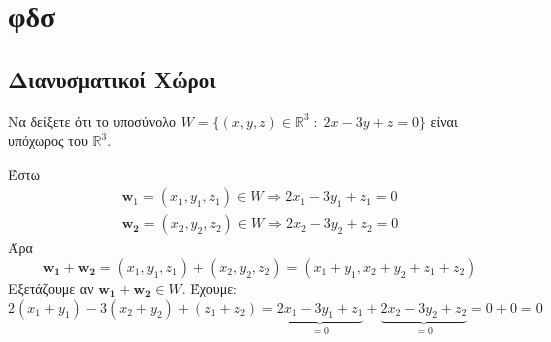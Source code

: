 





\chapter{φδσ}

\section{Διανυσματικοί Χώροι}


\begin{exercise}
    Να δείξετε ότι το υποσύνολο $ W = \{(x,y,z)\in \mathbb{R}^{3} \; : 
    \; 2x-3y+z=0 \} $ είναι υπόχωρος του $ \mathbb{R}^{3} $.
\end{exercise}

\begin{solution}
\item {}
    Έστω 
    \begin{align*}
        \mathbf{w}_{1} = (x_{1}, y_{1}, z_{1}) \in W 
        \Rightarrow  2 x_{1} - 3 y_{1} + z_{1} = 0 \\
        \mathbf{w_{2}} = (x_{2}, y_{2}, z_{2}) \in W 
        \Rightarrow 2 x_{2} - 3 y_{2} + z_{2} = 0
    \end{align*} 
    Άρα 
    \[
        \mathbf{w_{1}}+ \mathbf{w_{2}} = (x_{1}, y_{1}, z_{1}) + 
        (x_{2}, y_{2}, z_{2}) = (x_{1}+ y_{1}, x_{2}+ y_{2}+ z_{1} + z_{2})
    \] 
    Εξετάζουμε αν $ \mathbf{w_{1}}+ \mathbf{w_{2}} \in W $. Έχουμε:
    \[
        2 (x_{1}+ y_{1}) -3 (x_{2}+ y_{2}) + (z_{1}+ z_{2}) = 
        \underbrace{2 x_{1} - 3 y_{1} + z_{1}}_{=0} + 
        \underbrace{2 x_{2}- 3 y_{2} + z_{2}}_{=0} = 0 + 0 = 0 
    \] 
\end{solution}


